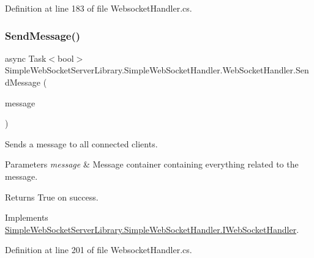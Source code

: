 Definition at line 183 of file Websocket\+Handler.\+cs.

\mbox{\label{class_simple_web_socket_server_library_1_1_simple_web_socket_handler_1_1_web_socket_handler_af6f2bd90d72a21a48f1f46a0d42af80d}} 
\subsubsection{\texorpdfstring{Send\+Message()}{SendMessage()}\hspace{0.1cm}{\footnotesize\ttfamily [2/2]}}
{\footnotesize\ttfamily async Task$<$bool$>$ Simple\+Web\+Socket\+Server\+Library.\+Simple\+Web\+Socket\+Handler.\+Web\+Socket\+Handler.\+Send\+Message (\begin{DoxyParamCaption}\item[{\mbox{\hyperlink{class_simple_web_socket_server_library_1_1_web_socket_message_container}{Web\+Socket\+Message\+Container}}}]{message }\end{DoxyParamCaption})}



Sends a message to all connected clients. 


\begin{DoxyParams}{Parameters}
{\em message} & Message container containing everything related to the message.\\
\hline
\end{DoxyParams}
\begin{DoxyReturn}{Returns}
True on success.
\end{DoxyReturn}


Implements \mbox{\hyperlink{interface_simple_web_socket_server_library_1_1_simple_web_socket_handler_1_1_i_web_socket_handler_a1b44785a16efa0750d5eb7e42aab28b8}{Simple\+Web\+Socket\+Server\+Library.\+Simple\+Web\+Socket\+Handler.\+I\+Web\+Socket\+Handler}}.



Definition at line 201 of file Websocket\+Handler.\+cs.

